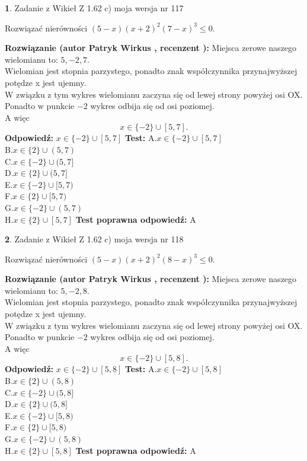 \documentclass[12pt, a4paper]{article}
\theoremstyle{definition} %
\newtheorem{zad}{}
\newcommand{\zadStart}[1]{\begin{zad}#1\newline}
\newcommand{\zadStop}{\end{zad}}
\newcommand{\rozwStart}[2]{\noindent \textbf{Rozwiązanie (autor #1 , recenzent #2): }\newline}
\newcommand{\rozwStop}{\newline}
\newcommand{\odpStart}{\noindent \textbf{Odpowiedź:}\newline}
\newcommand{\odpStop}{\newline}
\newcommand{\testStart}{\noindent \textbf{Test:}\newline}
\newcommand{\testStop}{\newline}
\newcommand{\kluczStart}{\noindent \textbf{Test poprawna odpowiedź:}\newline}
\newcommand{\kluczStop}{\newline}
\begin{document}
\zadStart{Zadanie z Wikieł Z 1.62 c) moja wersja nr 117}

Rozwiązać nierówności $(5-x)(x+2)^{2}(7-x)^{3}\le0$.
\zadStop
\rozwStart{Patryk Wirkus}{}
Miejsca zerowe naszego wielomianu to: $5, -2, 7$.\\
Wielomian jest stopnia parzystego, ponadto znak współczynnika przy\linebreak najwyższej potędze x jest ujemny.\\ W związku z tym wykres wielomianu zaczyna się od lewej strony powyżej osi OX.\\
Ponadto w punkcie $-2$ wykres odbija się od osi poziomej.\\
A więc $$x \in \{-2\} \cup [5,7].$$
\rozwStop
\odpStart
$x \in \{-2\} \cup [5,7]$
\odpStop
\testStart
A.$x \in \{-2\} \cup [5,7]$\\
B.$x \in \{2\} \cup (5,7)$\\
C.$x \in \{-2\} \cup (5,7]$\\
D.$x \in \{2\} \cup (5,7]$\\
E.$x \in \{-2\} \cup [5,7)$\\
F.$x \in \{2\} \cup [5,7)$\\
G.$x \in \{-2\} \cup (5,7)$\\
H.$x \in \{2\} \cup [5,7]$
\testStop
\kluczStart
A
\kluczStop



\zadStart{Zadanie z Wikieł Z 1.62 c) moja wersja nr 118}

Rozwiązać nierówności $(5-x)(x+2)^{2}(8-x)^{3}\le0$.
\zadStop
\rozwStart{Patryk Wirkus}{}
Miejsca zerowe naszego wielomianu to: $5, -2, 8$.\\
Wielomian jest stopnia parzystego, ponadto znak współczynnika przy\linebreak najwyższej potędze x jest ujemny.\\ W związku z tym wykres wielomianu zaczyna się od lewej strony powyżej osi OX.\\
Ponadto w punkcie $-2$ wykres odbija się od osi poziomej.\\
A więc $$x \in \{-2\} \cup [5,8].$$
\rozwStop
\odpStart
$x \in \{-2\} \cup [5,8]$
\odpStop
\testStart
A.$x \in \{-2\} \cup [5,8]$\\
B.$x \in \{2\} \cup (5,8)$\\
C.$x \in \{-2\} \cup (5,8]$\\
D.$x \in \{2\} \cup (5,8]$\\
E.$x \in \{-2\} \cup [5,8)$\\
F.$x \in \{2\} \cup [5,8)$\\
G.$x \in \{-2\} \cup (5,8)$\\
H.$x \in \{2\} \cup [5,8]$
\testStop
\kluczStart
A
\kluczStop
\end{document}
